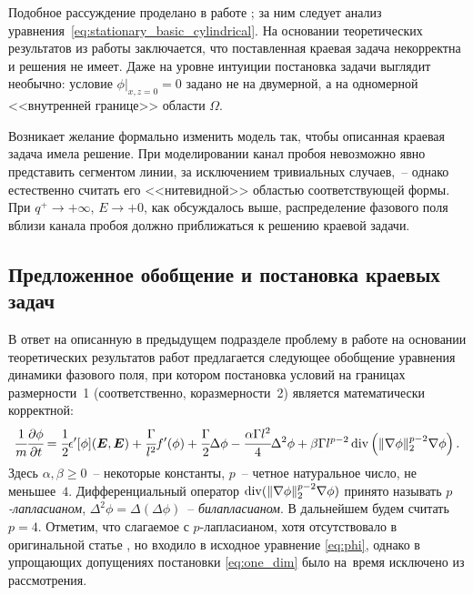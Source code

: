 Подобное рассуждение проделано в работе \cite{zipunova_higher_codimension}; за ним следует анализ уравнения~\eqref{eq:stationary_basic_cylindrical}. На основании теоретических результатов из работы \cite{cirstea_elliptic_equations} заключается, что поставленная краевая задача некорректна и решения не имеет. Даже на уровне интуиции постановка задачи выглядит необычно: условие $\phi|_{x,z = 0} = 0$ задано не на двумерной, а на одномерной <<внутренней границе>> области $\Omega$.

Возникает желание формально изменить модель так, чтобы описанная краевая задача имела решение. При моделировании канал пробоя невозможно явно представить сегментом линии, за исключением тривиальных случаев,~-- однако естественно считать его <<нитевидной>> областью соответствующей формы. При $q^+ \to +\infty$, $E \to +0$, как обсуждалось выше, распределение фазового поля вблизи канала пробоя должно приближаться к решению краевой задачи.


\subsection{Предложенное обобщение и постановка краевых задач}

В ответ на описанную в предыдущем подразделе проблему в работе \cite{zipunova_higher_codimension} на основании теоретических результатов работ \cite{sobolev_functional_analysis, oleynik_biharmonic_equations, sternin_elliptic_equations, lewis_quasi_linear} предлагается следующее обобщение уравнения динамики фазового поля, при котором постановка условий на границах размерности~1 (соответственно, коразмерности~2) является математически корректной:
\begin{equation}
    \cfrac{1}{m} \cfrac{\partial \phi}{\partial t} = \cfrac{1}{2} \epsilon'[\phi] ({\boldsymbol{E}}, {\boldsymbol{E}}) + \cfrac{\Gamma}{l^2} f'(\phi) + \cfrac{\Gamma}{2} \Delta \phi - \cfrac{\alpha \Gamma l^2}{4} \Delta^2 \phi + \beta \Gamma l^{p - 2} \operatorname{{div}} \left( \| \nabla \phi \|_2^{p - 2} \nabla \phi \right).
    \label{eq:phi_corrected}
\end{equation}
Здесь $\alpha, \beta \geqslant 0$~-- некоторые константы, $p$~-- четное натуральное число, не меньшее~$4$. Дифференциальный оператор $\operatorname{{div}} (\| \nabla \phi \|_2^{p - 2} \nabla \phi)$ принято называть \emph{$p$-лапласианом}, \linebreak $\Delta^2 \phi = \Delta(\Delta \phi)$~-- \emph{билапласианом}. В дальнейшем будем считать $p = 4$. Отметим, что слагаемое с $p$-лапласианом, хотя отсутствовало в оригинальной статье \cite{pitike_dielectric_breakdown}, но входило в исходное уравнение \eqref{eq:phi}, однако в упрощающих допущениях постановки \eqref{eq:one_dim} было на~время исключено из рассмотрения.

